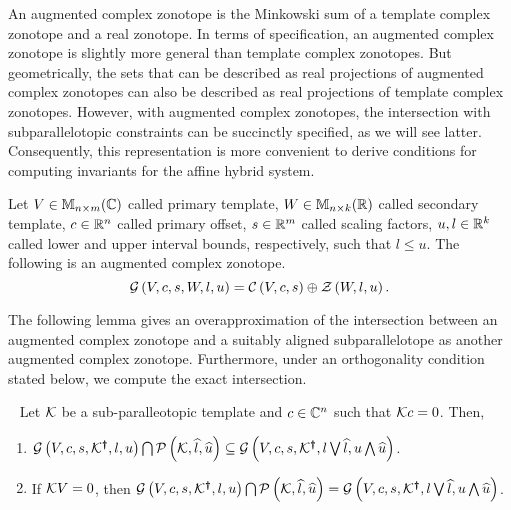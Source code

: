 An augmented complex zonotope is the Minkowski sum of a template
complex zonotope and a real zonotope.  In terms of specification, an
augmented complex zonotope is slightly more general than template
complex zonotopes.  But geometrically, the sets that can be described
as real projections of augmented complex zonotopes can also be
described as real projections of template complex zonotopes.  However,
with augmented complex zonotopes, the intersection with
subparallelotopic constraints can be succinctly specified, as we will
see latter.  Consequently, this representation is more convenient to
derive conditions for computing invariants for the affine hybrid
system.
%
\begin{definition}
Let $V\in\mathbb{M}_{n\times m}(\mathbb{C})$ called primary template, $W\in\mathbb{M}_{n\times k}(\mathbb{R})$
called secondary template, $c\in\mathbb{R}^n$ called primary offset,
$s\in\mathbb{R}^m$ called scaling factors, $u,l\in\mathbb{R}^k$ called lower
and upper interval bounds, respectively, such that $l\leq u$.  The
following is an augmented complex
zonotope.
\begin{equation*}
\mathcal{G}\left(V,c,s,W,l,u\right) = \mathcal{C}\left(V,c,s\right)\oplus\mathcal{Z}\left(W,l,u\right).
\end{equation*}
\end{definition}
%
The following lemma gives an overapproximation of the intersection
between an augmented complex zonotope and a suitably aligned
subparallelotope as another augmented complex zonotope.  Furthermore,
under an orthogonality condition stated below, we compute the exact
intersection.
%
\begin{lemma}~\label{lem:acz-int}
Let $\mathcal{K}$ be a sub-paralleotopic template and $c\in\mathbb{C}^n$
such that $\mathcal{K} c=0$.  Then,
\begin{enumerate}
\item
  $\mathcal{G}\left(V,c,s,\mathcal{K}^{\bm{\dagger}},l,u\right)\bigcap\mathcal{P}\left(\mathcal{K},\widehat{l},\widehat{u}\right)\subseteq
  \mathcal{G}\left(V,c,s,\mathcal{K}^{\bm{\dagger}},l\bigvee\widehat{l},u\bigwedge\widehat{u}\right)$.
\item If $\mathcal{K} V=0$, then $\mathcal{G}\left(V,c,s,\mathcal{K}^{\bm{\dagger}},l,u\right)\bigcap\mathcal{P}\left(\mathcal{K},\widehat{l},\widehat{u}\right)=
  \mathcal{G}\left(V,c,s,\mathcal{K}^{\bm{\dagger}},l\bigvee\widehat{l},u\bigwedge\widehat{u}\right)$.
\end{enumerate}
\end{lemma}
%
